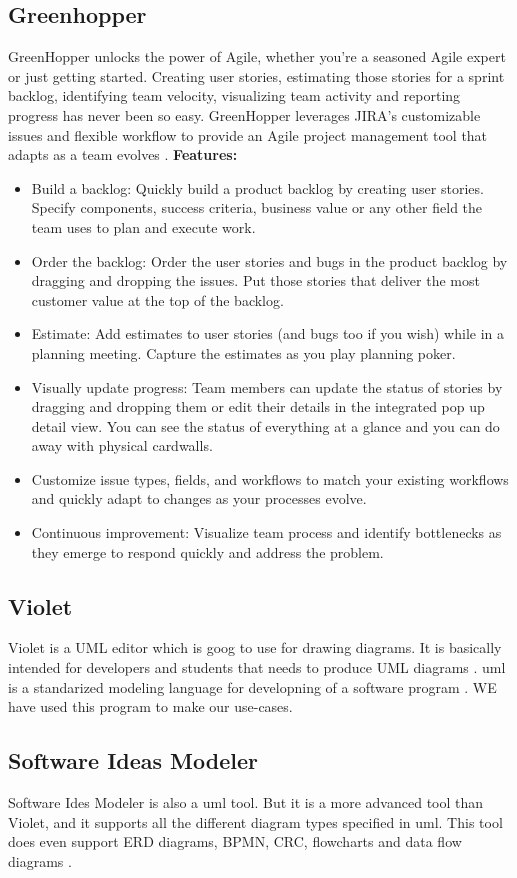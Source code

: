 \subsection{Greenhopper}
GreenHopper unlocks the power of Agile, whether you're a seasoned Agile expert or just getting started. Creating user stories, estimating those stories for a sprint backlog, identifying team velocity, visualizing team activity and reporting progress has never been so easy.
\newline
\newline
GreenHopper leverages JIRA's customizable issues and flexible workflow to provide an Agile project management tool that adapts as a team evolves \cite{bib:green}.
\newline
\newline
\textbf{Features:}
\begin{itemize}
\item{}Build a backlog: Quickly build a product backlog by creating user stories. Specify components, success criteria, business value or any other field the team uses to plan and execute work.
\item{}Order the backlog: Order the user stories and bugs in the product backlog by dragging and dropping the issues. Put those stories that deliver the most customer value at the top of the backlog.
\item{}Estimate: Add estimates to user stories (and bugs too if you wish) while in a planning meeting. Capture the estimates as you play planning poker.
\item{}Visually update progress: Team members can update the status of stories by dragging and dropping them or edit their details in the integrated pop up detail view. You can see the status of everything at a glance and you can do away with physical cardwalls.
\item{}Customize issue types, fields, and workflows to match your existing workflows and quickly adapt to changes as your processes evolve.
\item{}Continuous improvement: Visualize team process and identify bottlenecks as they emerge to respond quickly and address the problem.
\end{itemize}

\subsection{Violet}
Violet is a UML editor which is goog to use for drawing diagrams. It is basically intended for developers and students that needs to produce UML diagrams \cite{bib:violet}. \gls{uml} is a standarized modeling language for developning of a software program \cite{bib:lmu}. WE have used this program to make our use-cases.

\subsection{Software Ideas Modeler}
Software Ides Modeler is also a \gls{uml} tool. But it is a more advanced tool than Violet, and it supports all the different diagram types specified in \gls{uml}. This tool does even support ERD diagrams, BPMN, CRC, flowcharts and data flow diagrams \cite{bib:sim}.